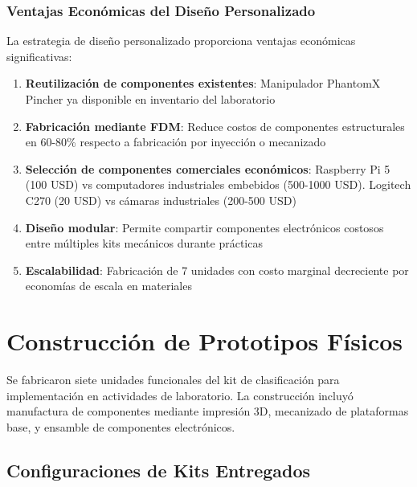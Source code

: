 \subsubsection{Ventajas Económicas del Diseño Personalizado}

La estrategia de diseño personalizado proporciona ventajas económicas significativas:

\begin{enumerate}
    \item \textbf{Reutilización de componentes existentes}: Manipulador PhantomX Pincher ya disponible en inventario del laboratorio
    
    \item \textbf{Fabricación mediante FDM}: Reduce costos de componentes estructurales en 60-80\% respecto a fabricación por inyección o mecanizado
    
    \item \textbf{Selección de componentes comerciales económicos}: Raspberry Pi 5 (100 USD) vs computadores industriales embebidos (500-1000 USD). Logitech C270 (20 USD) vs cámaras industriales (200-500 USD)
    
    \item \textbf{Diseño modular}: Permite compartir componentes electrónicos costosos entre múltiples kits mecánicos durante prácticas
    
    \item \textbf{Escalabilidad}: Fabricación de 7 unidades con costo marginal decreciente por economías de escala en materiales
\end{enumerate}

\section{Construcción de Prototipos Físicos}

Se fabricaron siete unidades funcionales del kit de clasificación para implementación en actividades de laboratorio. La construcción incluyó manufactura de componentes mediante impresión 3D, mecanizado de plataformas base, y ensamble de componentes electrónicos.

\subsection{Configuraciones de Kits Entregados}

